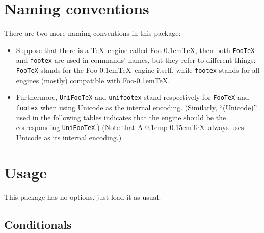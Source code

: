 \documentclass[a4paper]{article}
\newcommand\pTeX{p\kern-0.15em\TeX}
\newcommand\ApTeX{A\kern-0.1em\pTeX}
\newcommand\FooTeX{Foo\kern-0.1em\TeX}
\newcommand\UNI{(Unicode)}
\begin{document}
\section{Naming conventions}

There are two more naming conventions in this package:
\begin{itemize}
\item Suppose that there is a \TeX\ engine called \FooTeX, then both
  \verb|FooTeX| and \verb|footex| are used in commands' names, but they refer to
  different things: \verb|FooTeX| stands for the \FooTeX\ engine itself, while
  \verb|footex| stands for all engines (mostly) compatible with \FooTeX.
\item Furthermore, \verb|UniFooTeX| and \verb|unifootex| stand respectively for
  \verb|FooTeX| and \verb|footex| when using Unicode as the internal encoding.
  (Similarly, ``\UNI'' used in the following tables indicates that the engine
  should be the corresponding \verb|UniFooTeX|.) (Note that \ApTeX\ always uses
  Unicode as its internal encoding.)
\end{itemize}

\section{Usage}

This package has no options, just load it as usual:

\subsection{Conditionals}
\end{document}

